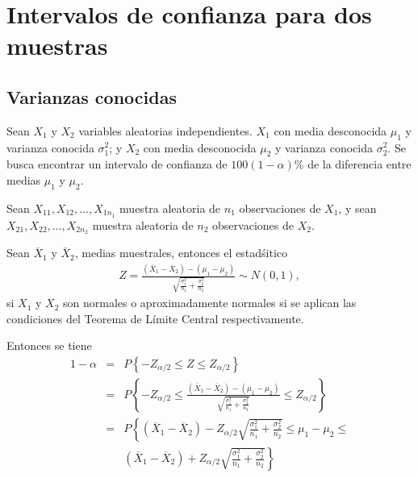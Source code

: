 \section{Intervalos de confianza para dos muestras}
\subsection*{Varianzas conocidas}




Sean $X_{1}$ y $X_{2}$ variables aleatorias independientes. $X_{1}$ con media desconocida $\mu_{1}$ y varianza conocida $\sigma_{1}^{2}$; y $X_{2}$ con media desconocida $\mu_{2}$ y varianza conocida $\sigma_{2}^{2}$. Se busca encontrar un intervalo de confianza de $100\left(1-\alpha\right)\%$ de la diferencia entre medias $\mu_{1}$ y $\mu_{2}$.\medskip

Sean $X_{11},X_{12},\ldots,X_{1n_{1}}$ muestra aleatoria de $n_{1}$ observaciones de $X_{1}$, y sean $X_{21},X_{22},\ldots,X_{2n_{2}}$ muestra aleatoria de $n_{2}$ observaciones de $X_{2}$.\medskip

Sean $\overline{X}_{1}$ y $\overline{X}_{2}$, medias muestrales, entonces el estad\'sitico 
\begin{eqnarray}
Z=\frac{\left(\overline{X}_{1}-\overline{X}_{2}\right)-\left(\mu_{1}-\mu_{2}\right)}{\sqrt{\frac{\sigma_{1}^{2}}{n_{1}}+\frac{\sigma_{2}^{2}}{n_{2}}}}\sim N\left(0,1\right),\end{eqnarray}
si $X_{1}$ y $X_{2}$ son normales o aproximadamente normales si se aplican las condiciones del Teorema de L\'imite Central respectivamente. 







Entonces se tiene
\begin{eqnarray*}
1-\alpha&=& P\left\{-Z_{\alpha/2}\leq Z\leq Z_{\alpha/2}\right\}\\
&=&P\left\{-Z_{\alpha/2}\leq \frac{\left(\overline{X}_{1}-\overline{X}_{2}\right)-\left(\mu_{1}-\mu_{2}\right)}{\sqrt{\frac{\sigma_{1}^{2}}{n_{1}}+\frac{\sigma_{2}^{2}}{n_{2}}}}\leq Z_{\alpha/2}\right\}\\
&=&P\left\{\left(\overline{X}_{1}-\overline{X}_{2}\right)-Z_{\alpha/2}\sqrt{\frac{\sigma_{1}^{2}}{n_{1}}+\frac{\sigma_{2}^{2}}{n_{2}}}\leq \mu_{1}-\mu_{2}\leq\right.\\
&&\left. \left(\overline{X}_{1}-\overline{X}_{2}\right)+Z_{\alpha/2}\sqrt{\frac{\sigma_{1}^{2}}{n_{1}}+\frac{\sigma_{2}^{2}}{n_{2}}}\right\}
\end{eqnarray*}

